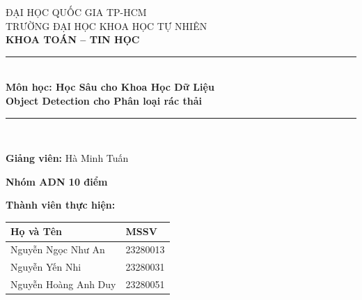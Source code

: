 \documentclass[12pt, a4paper]{article}
\begin{document}
\renewcommand{\figurename}{Hình}
\thispagestyle{empty}

\begin{center}
    {\large ĐẠI HỌC QUỐC GIA TP-HCM}\\[5pt]
    {\large TRƯỜNG ĐẠI HỌC KHOA HỌC TỰ NHIÊN}\\[15pt]
    
    {\bfseries\large KHOA TOÁN – TIN HỌC}\\[10pt]
    
    \rule{\textwidth}{0.8pt}\\[25pt]
    
    {\Large \textbf{Môn học: Học Sâu cho Khoa Học Dữ Liệu}}\\[15pt]
    {\Huge \textbf{Object Detection cho Phân loại rác thải}}
    
    \par\vspace{20pt}
    \rule{\textwidth}{0.4pt}\\[20pt]
\end{center}

\begin{center}
\end{center}

\begin{center}
\vspace{1.0cm}
\large\textbf{Giảng viên:} Hà Minh Tuấn

\vspace{2.5em}

    {\large \textbf{Nhóm ADN 10 điểm}}
    \par\vspace{1em}
    
    \textbf{Thành viên thực hiện:}
    \par\vspace{0.5em}
    
    \begin{tabular}{ll}
    \toprule 
    \textbf{Họ và Tên} & \textbf{MSSV} \\
    \midrule 
    Nguyễn Ngọc Như An & 23280013 \\
    Nguyễn Yến Nhi & 23280031 \\
    Nguyễn Hoàng Anh Duy & 23280051 \\
    \bottomrule 
    \end{tabular}
\end{center}
\end{document}
